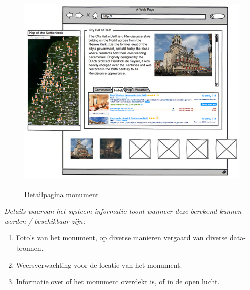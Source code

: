 \documentclass[a4paper,10pt]{article}
\begin{document}
			\begin{figure}[ht!]
				\centering
				\includegraphics[height=10cm]{interface3.png}
				\caption{Detailpagina monument \label{interface3}}
			\end{figure}
			\textit{Details waarvan het systeem informatie toont wanneer deze berekend kunnen worden / beschikbaar zijn:}
			\begin{enumerate}
				\item Foto's van het monument, op diverse manieren vergaard van diverse data-bronnen.
				\item Weersverwachting voor de locatie van het monument.
				\item Informatie over of het monument overdekt is, of in de open lucht.
			\end{enumerate}
	
\end{document}
